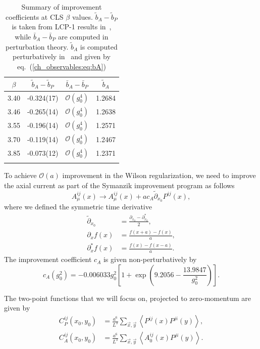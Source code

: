 \begin{longtable}{c c c c}
    \label{ch_observables:tab:b}
    $\beta$ & $\tilde{b}_A-\tilde{b}_P$ & $\bar{b}_A-\bar{b}_P$ & $\tilde{b}_A$ \\
    \toprule
    3.40 & -0.324(17) & $\mathcal{O}(g_0^4)$ & 1.2684 \\
    3.46 & -0.265(14) & $\mathcal{O}(g_0^4)$ & 1.2638 \\
    3.55 & -0.196(14) & $\mathcal{O}(g_0^4)$ & 1.2571 \\
    3.70 & -0.119(14) & $\mathcal{O}(g_0^4)$ & 1.2467 \\
    3.85 & -0.073(12) & $\mathcal{O}(g_0^4)$ & 1.2371 \\
    \bottomrule
    \caption{Summary of improvement coefficients at CLS $\beta$ values. $\tilde{b}_A-\tilde{b}_P$ is taken from LCP-1 results in~\citep{deDivitiis:2017vvw}, while $\bar{b}_A-\bar{b}_P$ are computed in perturbation theory. $\tilde{b}_A$ is computed perturbatively in~\citep{Taniguchi:1998pf} and given by eq.~(\ref{ch_observables:eq:bA})}
\end{longtable}

To achieve $\mathcal{O}(a)$ improvement in the Wilson regularization, we need to improve the axial current as part of the Symanzik improvement program as follows
\begin{equation}
\label{ch_observables:eq:axial_impr}
A_{\mu}^{ij}(x)\rightarrow A_{\mu}^{ij}(x)+ac_A\tilde{\partial}_{x_0}P^{ij}(x),
\end{equation}
where we defined the symmetric time derivative
\begin{align}
\tilde{\partial}_{x_0}&=\frac{\partial_{x_0}-\partial_{x_0}^*}{2},\\
\partial_{x}f(x)&=\frac{f(x+a)-f(x)}{a},\\
\partial^*_{x}f(x)&=\frac{f(x)-f(x-a)}{a}.
\end{align}
The improvement coefficient $c_A$ is given non-perturbatively by~\citep{Bulava:2015bxa}
\begin{equation}
c_A(g_0^2)=-0.006033g_0^2\left[1+\exp\left(9.2056-\frac{13.9847}{g_0^2}\right)\right].
\end{equation}

The two-point functions that we will focus on, projected to zero-momentum are given by
\begin{align}
\label{ch_observables:eq:corrs}
C_P^{ij}(x_0,y_0)&=\frac{a^6}{L^3}\sum_{\vec{x},\vec{y}}\left<P^{ij}(x)P^{ji}(y)\right>,\\
C_A^{ij}(x_0,y_0)&=\frac{a^6}{L^3}\sum_{\vec{x},\vec{y}}\left<A_0^{ij}(x)P^{ji}(y)\right>.
\end{align}

